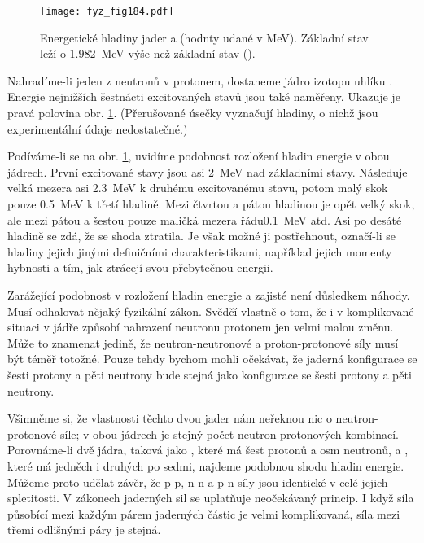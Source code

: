     \begin{figure}[ht!]  %
      \centering
      \texttt{[image: fyz\_fig184.pdf]}
      \caption{Energetické hladiny jader  a  (hodnty udané v
              \si{\mega\electronvolt}). Základní stav  leží o
              \SI{1.982}{\mega\electronvolt} výše než základní stav 
              (\cite[s.~149]{Feynman02}).}
      \label{fyz:fig184}
    \end{figure}

    Nahradíme-li jeden z neutronů v  protonem, dostaneme jádro izotopu uhlíku .
    Energie nejnižších šestnácti excitovaných stavů  jsou také naměřeny. Ukazuje je pravá
    polovina obr. \ref{fyz:fig184}. (Přerušované úsečky vyznačují hladiny, o nichž jsou
    experimentální údaje nedostatečné.)

    Podíváme-li se na obr. \ref{fyz:fig184}, uvidíme podobnost rozložení hladin energie v obou
    jádrech. První excitované stavy jsou asi \SI{2}{\mega\electronvolt} nad základními stavy.
    Následuje velká mezera asi \SI{2.3}{\mega\electronvolt} k druhému excitovanému stavu, potom malý
    skok pouze \SI{0.5}{\mega\electronvolt} k třetí hladině. Mezi čtvrtou a pátou hladinou je opět
    velký skok, ale mezi pátou a šestou pouze maličká mezera řádu\SI{0.1}{\mega\electronvolt} atd.
    Asi po desáté hladině se zdá, že se shoda ztratila. Je však možné ji postřehnout, označí-li se
    hladiny jejich jinými definičními charakteristikami, například jejich momenty hybnosti a tím,
    jak ztrácejí svou přebytečnou energii.

    Zarážející podobnost v rozložení hladin energie  a  zajisté není důsledkem
    náhody. Musí odhalovat nějaký fyzikální zákon. Svědčí vlastně o tom, že i v komplikované situaci
    v jádře způsobí nahrazení neutronu protonem jen velmi malou změnu. Může to znamenat jedině, že
    neutron-neutronové a proton-protonové síly musí být téměř totožné. Pouze tehdy bychom mohli
    očekávat, že jaderná konfigurace se šesti protony a pěti neutrony bude stejná jako konfigurace
    se šesti protony a pěti neutrony.

    Všimněme si, že vlastnosti těchto dvou jader nám neřeknou nic o neutron-protonové síle; v obou
    jádrech je stejný počet neutron-protonových kombinací. Porovnáme-li dvě jádra, taková jako
    , které má šest protonů a osm neutronů, a , které má jedněch i druhých po
    sedmi, najdeme podobnou shodu hladin energie. Můžeme proto udělat závěr, že p-p, n-n a p-n síly
    jsou identické v celé jejich spletitosti. V zákonech jaderných sil se uplatňuje neočekávaný
    princip. I když síla působící mezi každým párem jaderných částic je velmi komplikovaná, síla
    mezi třemi odlišnými páry je stejná.

